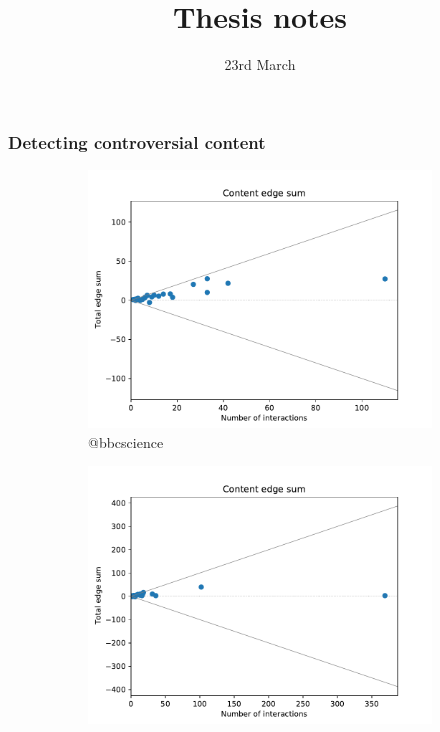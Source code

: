 \documentclass{beamer}
\title{Thesis notes}
\date{23rd March}
\begin{document}
\frame{\titlepage}

\begin{frame}[c]
    \frametitle{Detecting controversial content}
    \begin{figure}
        \begin{center}
            \begin{subfigure}[b]{0.4\textwidth}
                \centering
                \includegraphics[width=\textwidth]{out/bbcscience200/edge-sum-n-interactions.pdf}
                \caption{@bbcscience}
                \label{fig:out/bbctech200/edge-sum-n-interactions.pdf}
            \end{subfigure}
            \begin{subfigure}[b]{0.4\textwidth}
                \centering
                \includegraphics[width=\textwidth]{out/bbctech200/edge-sum-n-interactions.pdf}

\end{subfigure}
\end{center}
\end{figure}
\end{frame}
\end{document}

